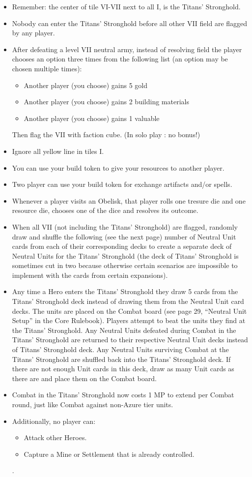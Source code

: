 \begin{itemize}
	\item Remember: the center of tile VI-VII next to all I, is the Titans' Stronghold.
	\item Nobody can enter the Titans' Stronghold before all other VII field are flagged by any player.
	\item After defeating a level VII neutral army, instead of resolving field the player chooses an option three times from the following list (an option may be chosen multiple times):
	\begin{itemize}
		\item Another player (you choose) gains 5 gold
		\item Another player (you choose) gains 2 building materials
		\item Another player (you choose) gains 1 valuable
	\end{itemize}
	Then flag the VII with faction cube.
	(In solo play : no bonus!)
	\item Ignore all yellow line in tiles I.
	\item You can use your build token to give your resources to another player.
	\item Two player can use your build token for exchange artifacts and/or spells.
	\item Whenever a player visits an Obelisk, that player rolls one tresure die and one resource die, chooses one of the dice and resolves its outcome.
	\item When all VII (not including the Titans' Stronghold) are flagged, randomly draw and shuffle the following (see the next page) number of Neutral Unit cards from each of their corresponding decks to create a separate deck of Neutral Units for the Titans' Stronghold (the deck of Titans' Stronghold is sometimes cut in two because otherwise certain scenarios are impossible to implement with the cards from certain expansions).
	\item Any time a Hero enters the Titans' Stronghold they draw 5 cards from the Titans' Stronghold deck instead of drawing them from the Neutral Unit card decks. The units are placed on the Combat board (see page 29, “Neutral Unit Setup” in the Core Rulebook). Players attempt to beat the units they find at the Titans' Stronghold. Any Neutral Units defeated during Combat in the Titans' Stronghold are returned to their respective Neutral Unit decks instead of Titans' Stronghold deck. Any Neutral Units surviving Combat at the Titans' Stronghold are shuffled back into the Titans' Stronghold deck. If there are not enough Unit cards in this deck, draw as many Unit cards as there are and place them on the Combat board.
	\item Combat in the Titans' Stronghold now costs 1 MP to extend per Combat round, just like Combat against non-Azure tier units.
	\item Additionally, no player can:
	\begin{itemize}
		\item Attack other Heroes.
		\item Capture a Mine or Settlement that is already controlled.
	\end{itemize}.
\end{itemize}
